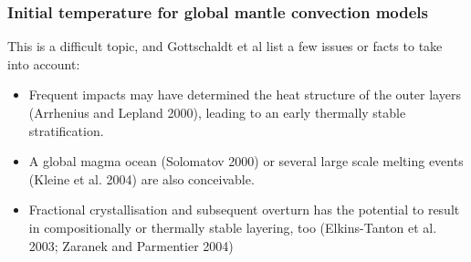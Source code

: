 

\subsubsection{Initial temperature for global mantle convection models}

This is a difficult topic, and Gottschaldt et al \cite{gows09} list a few issues or 
facts to take into account:
\begin{itemize}
\item Frequent  impacts  may  have  determined  the  heat structure of the outer layers (Arrhenius and Lepland 2000), leading to an early thermally stable stratification. 
\item A global magma ocean (Solomatov 2000)  or  several  large  scale  melting events  (Kleine et al. 2004)  are also conceivable. 
\item Fractional crystallisation and subsequent overturn has the potential to result in compositionally or thermally   stable   layering,   too   (Elkins-Tanton et al. 2003; Zaranek and Parmentier 2004)
\end{itemize}


